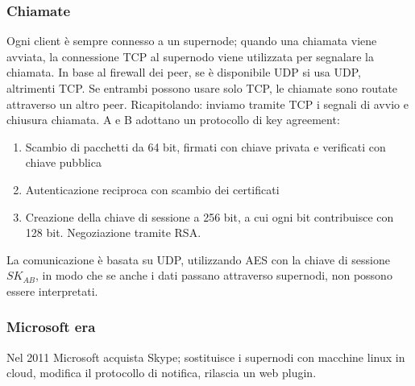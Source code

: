 \documentclass[11pt]{article}
\begin{document}
\subsubsection{Chiamate} Ogni client è sempre connesso a un supernode; quando una chiamata viene avviata, la connessione TCP al supernodo viene utilizzata per segnalare la chiamata. In base al firewall dei peer, se è disponibile UDP si usa UDP, altrimenti TCP. Se entrambi possono usare solo TCP, le chiamate sono routate attraverso un altro peer. Ricapitolando: inviamo tramite TCP i segnali di avvio e chiusura chiamata. A e B adottano un protocollo di key agreement:
\begin{enumerate}
    \item Scambio di pacchetti da 64 bit, firmati con chiave privata e verificati con chiave pubblica
    \item Autenticazione reciproca con scambio dei certificati 
    \item Creazione della chiave di sessione a 256 bit, a cui ogni bit contribuisce con 128 bit. Negoziazione tramite RSA.
\end{enumerate}
La comunicazione è basata su UDP, utilizzando AES con la chiave di sessione $SK_{AB}$, in modo che se anche i dati passano attraverso supernodi, non possono essere interpretati. 
\subsubsection{Microsoft era} Nel 2011 Microsoft acquista Skype; sostituisce i supernodi con macchine linux in cloud, modifica il protocollo di notifica, rilascia un web plugin.
\end{document}
